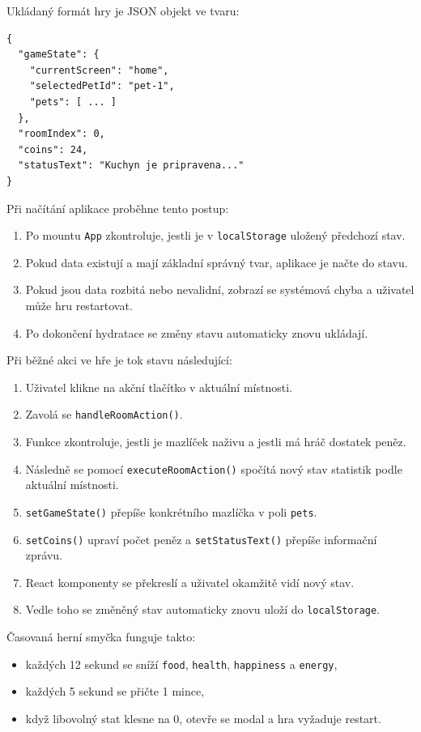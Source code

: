\documentclass[12pt,a4paper]{article}
\begin{document}
Ukládaný formát hry je JSON objekt ve tvaru:

\begin{verbatim}
{
  "gameState": {
    "currentScreen": "home",
    "selectedPetId": "pet-1",
    "pets": [ ... ]
  },
  "roomIndex": 0,
  "coins": 24,
  "statusText": "Kuchyn je pripravena..."
}
\end{verbatim}

Při načítání aplikace proběhne tento postup:
\begin{enumerate}[leftmargin=2em]
  \item Po mountu \texttt{App} zkontroluje, jestli je v \texttt{localStorage} uložený předchozí stav.
  \item Pokud data existují a mají základní správný tvar, aplikace je načte do stavu.
  \item Pokud jsou data rozbitá nebo nevalidní, zobrazí se systémová chyba a uživatel může hru restartovat.
  \item Po dokončení hydratace se změny stavu automaticky znovu ukládají.
\end{enumerate}

Při běžné akci ve hře je tok stavu následující:
\begin{enumerate}[leftmargin=2em]
  \item Uživatel klikne na akční tlačítko v aktuální místnosti.
  \item Zavolá se \texttt{handleRoomAction()}.
  \item Funkce zkontroluje, jestli je mazlíček naživu a jestli má hráč dostatek peněz.
  \item Následně se pomocí \texttt{executeRoomAction()} spočítá nový stav statistik podle aktuální místnosti.
  \item \texttt{setGameState()} přepíše konkrétního mazlíčka v poli \texttt{pets}.
  \item \texttt{setCoins()} upraví počet peněz a \texttt{setStatusText()} přepíše informační zprávu.
  \item React komponenty se překreslí a uživatel okamžitě vidí nový stav.
  \item Vedle toho se změněný stav automaticky znovu uloží do \texttt{localStorage}.
\end{enumerate}

Časovaná herní smyčka funguje takto:
\begin{itemize}[leftmargin=2em]
  \item každých 12 sekund se sníží \texttt{food}, \texttt{health}, \texttt{happiness} a \texttt{energy},
  \item každých 5 sekund se přičte 1 mince,
  \item když libovolný stat klesne na 0, otevře se modal  a hra vyžaduje restart.
\end{itemize}
\end{document}

